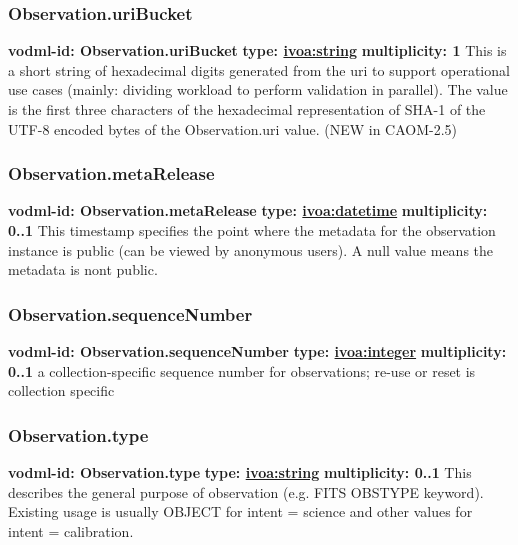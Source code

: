     \subsubsection{Observation.uriBucket}
      \textbf{vodml-id: Observation.uriBucket} \newline
      \textbf{type: \hyperref[sect:ivoa]{ivoa:string}} \newline
      \textbf{multiplicity: 1} \newline
      This is a short string of hexadecimal digits generated from the uri to support operational use cases (mainly: dividing workload to perform validation in parallel). The value is the first three characters of the hexadecimal representation of SHA-1 of the UTF-8 encoded bytes of the Observation.uri value. (NEW in CAOM-2.5)

    \subsubsection{Observation.metaRelease}
      \textbf{vodml-id: Observation.metaRelease} \newline
      \textbf{type: \hyperref[sect:ivoa]{ivoa:datetime}} \newline
      \textbf{multiplicity: 0..1} \newline
      This timestamp specifies the point where the metadata for the observation instance is public (can be viewed by anonymous users). A null value means the metadata is nont public.

    \subsubsection{Observation.sequenceNumber}
      \textbf{vodml-id: Observation.sequenceNumber} \newline
      \textbf{type: \hyperref[sect:ivoa]{ivoa:integer}} \newline
      \textbf{multiplicity: 0..1} \newline
      a collection-specific sequence number for observations; re-use or reset is collection specific

    \subsubsection{Observation.type}
      \textbf{vodml-id: Observation.type} \newline
      \textbf{type: \hyperref[sect:ivoa]{ivoa:string}} \newline
      \textbf{multiplicity: 0..1} \newline
      This describes the general purpose of observation (e.g. FITS OBSTYPE keyword). Existing usage is usually OBJECT for intent = science and other values for intent = calibration.

